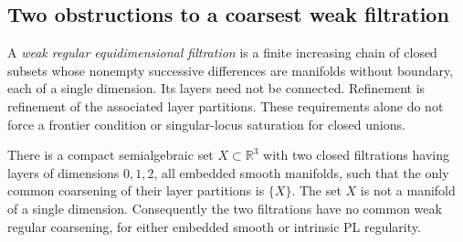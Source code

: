 \subsection{Two obstructions to a coarsest weak filtration}
\label{subsec:weak-filtration-counterexamples}
A \emph{weak regular equidimensional filtration} is a finite increasing
chain of closed subsets whose nonempty successive differences are
manifolds without boundary, each of a single dimension.  Its layers
need not be connected.  Refinement is refinement of the associated
layer partitions.  These requirements alone do not force a frontier
condition or singular-locus saturation for closed unions.

\begin{proposition}
\label{prop:weak-filtration-r3}
There is a compact semialgebraic set $X\subset\mathbb R^3$ with two
closed filtrations having layers of dimensions $0,1,2$, all embedded
smooth manifolds, such that the only common coarsening of their layer
partitions is $\{X\}$.  The set $X$ is not a manifold of a single
dimension.  Consequently the two filtrations have no common weak
regular coarsening, for either embedded smooth or intrinsic PL
regularity.
\end{proposition}
